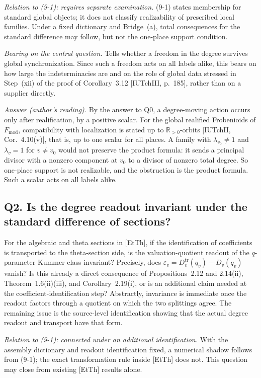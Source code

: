 \documentclass[11pt]{article}
\theoremstyle{definition}
\begin{document}
\emph{Relation to (9-1): requires separate examination.}  (9-1)
states membership for standard global objects; it does not
classify realizability of prescribed local families.  Under a
fixed dictionary and Bridge~(a), total consequences for the
standard difference may follow, but not the one-place support
condition.

\emph{Bearing on the central question.}  Tells whether a freedom in the
degree survives global synchronization.  Since such a freedom acts on
all labels alike, this bears on how large the indeterminacies are and
on the role of global data stressed in Step~(xii) of the proof of
Corollary~3.12 [IUTchIII, p.~185], rather than on a supplier
directly.

\emph{Answer (author's reading).}  By the answer to Q0, a
degree-moving action occurs only after realification, by a positive
scalar.  For the global realified Frobenioids of $F_{\mathrm{mod}}$,
compatibility with localization is stated up to $\mathbb R_{>0}$-orbits
[IUTchII, Cor.~4.10(v)], that is, up to one scalar for all places.  A
family with $\lambda_{v_0}\ne1$ and $\lambda_v=1$ for $v\ne v_0$ would
not preserve the product formula: it sends a principal divisor with a
nonzero component at $v_0$ to a divisor of nonzero total degree.  So
one-place support is not realizable, and the obstruction is the
product formula.  Such a scalar acts on all labels alike.

\subsection*{Q2. Is the degree readout invariant under the standard difference of sections?}

For the algebraic and theta sections in [EtTh], if the
identification of coefficients is transported to the theta-section
side, is the valuation-quotient readout of the $q$-parameter
Kummer class invariant?  Precisely, does
$\varepsilon_v=D_v^{\mathrm{tr}}(q_v)-D_v(q_v)$ vanish?  Is this
already a direct consequence of Propositions~2.12 and 2.14(ii),
Theorem~1.6(ii)(iii), and Corollary~2.19(i), or is an additional
claim needed at the coefficient-identification step?  Abstractly,
invariance is immediate once the readout factors through a
quotient on which the two splittings agree.  The remaining issue
is the source-level identification showing that the actual degree
readout and transport have that form.

\emph{Relation to (9-1): connected under an additional
identification.}  With the assembly dictionary and readout
identification fixed, a numerical shadow follows from (9-1); the
exact transformation rule inside [EtTh] does not.  This question
may close from existing [EtTh] results alone.
\end{document}
